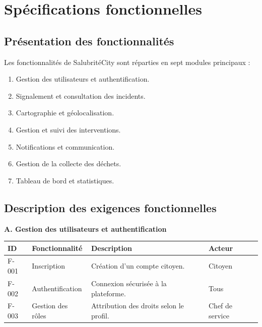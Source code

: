\documentclass[11pt,a4paper,oneside]{report}
\begin{document}
	
	
	\section{Spécifications fonctionnelles}
	
	\subsection{Présentation des fonctionnalités}
	
	Les fonctionnalités de SalubritéCity sont réparties
	en sept modules principaux :
	
	\begin{enumerate}
		\item Gestion des utilisateurs et authentification.
		\item Signalement et consultation des incidents.
		\item Cartographie et géolocalisation.
		\item Gestion et suivi des interventions.
		\item Notifications et communication.
		\item Gestion de la collecte des déchets.
		\item Tableau de bord et statistiques.
	\end{enumerate}
	
	\subsection{Description des exigences fonctionnelles}
	
	\small
	\renewcommand{\arraystretch}{1.15}
	
	\noindent\textbf{A. Gestion des utilisateurs et authentification}
	
	\begin{center}
		\begin{tabular}{|p{1.1cm}|p{3cm}|p{8cm}|p{1.7cm}|}
			\hline
			\textbf{ID} & \textbf{Fonctionnalité} &
			\textbf{Description} & \textbf{Acteur} \\ \hline
			F-001 & Inscription & Création d'un compte citoyen. & Citoyen \\ \hline
			F-002 & Authentification & Connexion sécurisée à la plateforme. & Tous \\ \hline
			F-003 & Gestion des rôles & Attribution des droits selon le profil. & Chef de service \\ \hline
		\end{tabular}
	\end{center}
	
\end{document}
